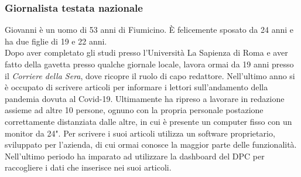 \subsubsection{Giornalista testata nazionale}
\label{sss:giornalista-testata-nazionale}
Giovanni è un uomo di 53 anni di Fiumicino. È felicemente sposato da 24 anni e ha due figlie di 19 e 22 anni.\\ 
Dopo aver completato gli studi presso l'Università La Sapienza di Roma e aver fatto della gavetta presso qualche giornale locale, lavora ormai da 19 anni presso il \textit{Corriere della Sera}, dove ricopre il ruolo di capo redattore. Nell'ultimo anno si è occupato di scrivere articoli per informare i lettori sull'andamento della pandemia dovuta al Covid-19. Ultimamente ha ripreso a lavorare in redazione assieme ad altre 10 persone, ognuno con la propria personale postazione correttamente distanziata dalle altre, in cui è presente un computer fisso con un monitor da 24".
Per scrivere i suoi articoli utilizza un software proprietario, sviluppato per l'azienda, di cui ormai conosce la maggior parte delle funzionalità. Nell'ultimo periodo ha imparato ad utilizzare la dashboard del DPC per raccogliere i dati che inserisce nei suoi articoli.
